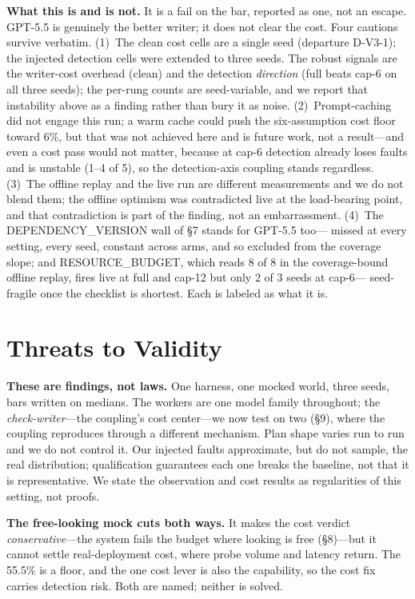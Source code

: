 \documentclass[acmsmall,screen]{acmart}
\begin{document}
\textbf{What this is and is not.} It is a fail on the bar, reported as one, not an
escape. GPT-5.5 is genuinely the better writer; it does not clear the cost. Four
cautions survive verbatim. (1)~The clean cost cells are a single seed (departure
D-V3-1); the injected detection cells were extended to three seeds. The robust
signals are the writer-cost overhead (clean) and the detection \emph{direction}
(full beats cap-6 on all three seeds); the per-rung counts are seed-variable, and
we report that instability above as a finding rather than bury it as noise.
(2)~Prompt-caching did not engage this run; a warm cache could push the
six-assumption cost floor toward 6\%, but that was not achieved here and is future
work, not a result---and even a cost pass would not matter, because at cap-6
detection already loses faults and is unstable (1--4 of 5), so the detection-axis
coupling stands regardless. (3)~The offline replay and the live run are different
measurements and we do not blend them; the offline optimism was contradicted live
at the load-bearing point, and that contradiction is part of the finding, not an
embarrassment. (4)~The DEPENDENCY\_VERSION wall of \S7 stands for GPT-5.5 too---
missed at every setting, every seed, constant across arms, and so excluded from
the coverage slope; and RESOURCE\_BUDGET, which reads 8 of 8 in the coverage-bound
offline replay, fires live at full and cap-12 but only 2 of 3 seeds at cap-6---
seed-fragile once the checklist is shortest. Each is labeled as what it is.

\section{Threats to Validity}
\textbf{These are findings, not laws.} One harness, one mocked world, three
seeds, bars written on medians. The workers are one model family throughout; the
\emph{check-writer}---the coupling's cost center---we now test on two (\S9), where
the coupling reproduces through a different mechanism. Plan shape varies run to
run and we do not control it. Our injected faults approximate, but do not sample, the real
distribution; qualification guarantees each one breaks the baseline, not that it
is representative. We state the observation and cost results as regularities of
this setting, not proofs.

\textbf{The free-looking mock cuts both ways.} It makes the cost verdict
\emph{conservative}---the system fails the budget where looking is free
(\S8)---but it cannot settle real-deployment cost, where probe volume and
latency return. The 55.5\% is a floor, and the one cost lever is also the
capability, so the cost fix carries detection risk. Both are named; neither is
solved.
\end{document}
